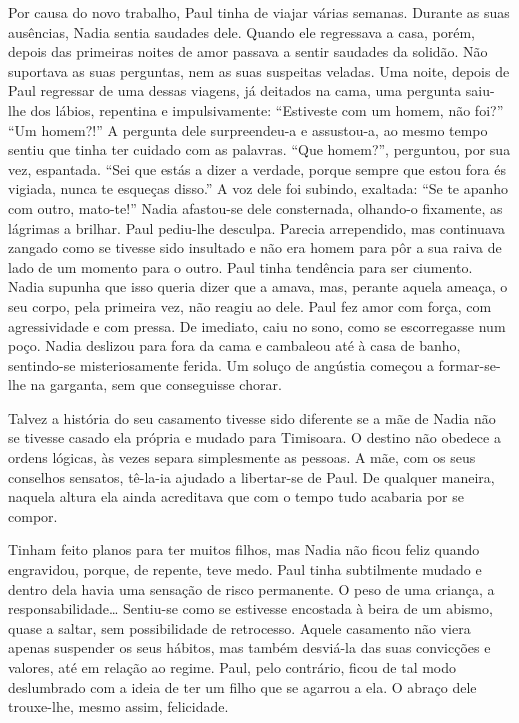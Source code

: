Por causa do novo trabalho, Paul tinha de viajar várias semanas. Durante
as suas ausências, Nadia sentia saudades dele. Quando ele regressava a
casa, porém, depois das primeiras noites de amor passava a sentir
saudades da solidão. Não suportava as suas perguntas, nem as suas
suspeitas veladas. Uma noite, depois de Paul regressar de
uma dessas viagens, já deitados na cama, uma pergunta saiu-lhe dos
lábios, repentina e impulsivamente: ``Estiveste com um homem, não foi?''
``Um homem?!'' A pergunta dele surpreendeu-a e assustou-a, ao mesmo tempo
sentiu que tinha ter cuidado com as palavras. ``Que homem?'', perguntou,
por sua vez, espantada. ``Sei que estás a dizer a verdade, porque sempre
que estou fora és vigiada, nunca te esqueças disso.'' A voz dele foi
subindo, exaltada: ``Se te apanho com outro, mato-te!'' Nadia afastou-se
dele consternada, olhando-o fixamente, as lágrimas a brilhar. Paul
pediu-lhe desculpa. Parecia arrependido, mas continuava zangado como se
tivesse sido insultado e não era homem para pôr a sua raiva de lado de
um momento para o outro. Paul tinha tendência para ser ciumento. Nadia
supunha que isso queria dizer que a amava, mas, perante aquela ameaça, o
seu corpo, pela primeira vez, não reagiu ao dele. Paul fez amor com
força, com agressividade e com pressa. De imediato, caiu no sono, como
se escorregasse num poço. Nadia deslizou para fora da cama e cambaleou
até à casa de banho, sentindo-se misteriosamente ferida. Um soluço de
angústia começou a formar-se-lhe na garganta,
sem que conseguisse chorar.

Talvez a história do seu casamento tivesse sido diferente se a mãe de
Nadia não se tivesse casado ela própria e mudado para Timisoara. O
destino não obedece a ordens lógicas, às vezes separa simplesmente as
pessoas. A mãe, com os seus conselhos sensatos, tê-la-ia ajudado a
libertar-se de Paul. De qualquer maneira, naquela altura ela ainda acreditava
que com o tempo tudo acabaria por se compor.

Tinham feito planos para ter muitos filhos, mas Nadia não ficou feliz
quando engravidou, porque, de repente, teve medo. Paul tinha subtilmente
mudado e dentro dela havia uma sensação de risco permanente. O peso de
uma criança, a responsabilidade\ldots{} Sentiu-se como se estivesse
encostada à beira de um abismo, quase a saltar, sem possibilidade de
retrocesso. Aquele casamento não viera apenas suspender os seus
hábitos, mas também desviá-la das suas convicções e valores, até em
relação ao regime. Paul, pelo contrário, ficou de tal modo deslumbrado
com a ideia de ter um filho que se agarrou a ela. O abraço dele trouxe-lhe, mesmo assim, felicidade.

